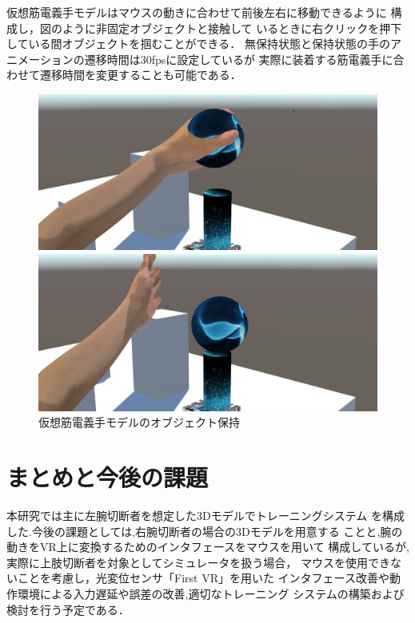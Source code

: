 \documentclass{ltjsarticle}
\begin{document}
		仮想筋電義手モデルはマウスの動きに合わせて前後左右に移動できるように
		構成し，図のように非固定オブジェクトと接触して
		いるときに右クリックを押下している間オブジェクトを掴むことができる．
		無保持状態と保持状態の手のアニメーションの遷移時間は30fpsに設定しているが
		実際に装着する筋電義手に合わせて遷移時間を変更することも可能である．

		\begin{figure}[H]
		\centering
		\begin{minipage}{0.4\columnwidth}
		\centering
		\includegraphics[width = \columnwidth]{figs/spheregrap2.png}
		\end{minipage}
		\hspace{0.05\columnwidth}
		\begin{minipage}{0.4\columnwidth}
		\centering
		\includegraphics[width = \columnwidth]{figs/spherereleace.png}
		\end{minipage}
		\vspace{-10pt}
		\caption{仮想筋電義手モデルのオブジェクト保持}
		\label{fig:spheregrap}
		\end{figure}
		\vspace{-34pt}

\section{まとめと今後の課題}
	本研究では主に左腕切断者を想定した3Dモデルでトレーニングシステム
	を構成した.今後の課題としては,右腕切断者の場合の3Dモデルを用意する
	ことと,腕の動きをVR上に変換するためのインタフェースをマウスを用いて
	構成しているが,実際に上肢切断者を対象としてシミュレータを扱う場合，
	マウスを使用できないことを考慮し，光変位センサ「First VR」を用いた
	インタフェース改善や動作環境による入力遅延や誤差の改善,適切なトレーニング
	システムの構築および検討を行う予定である．
\vspace{-12pt}
\end{document}
